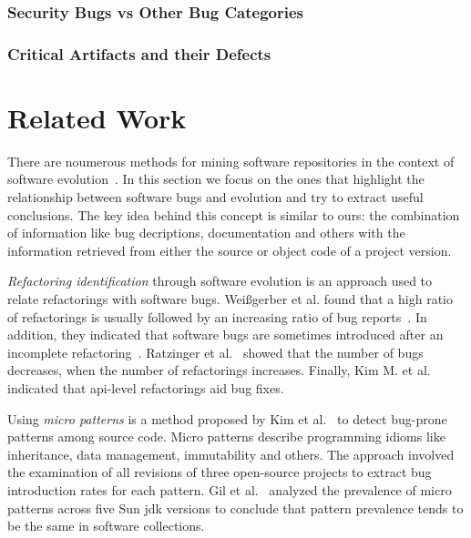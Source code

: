 \documentclass[conference]{IEEEtran}
\begin{document}
\subsubsection{Security Bugs {\sc vs} Other Bug Categories}

\subsubsection{Critical Artifacts and their Defects}

\section{Related Work}
\label{sec:rel}

There are noumerous methods for mining software repositories in the context
of software evolution~\cite{KCM07}. In this section we focus on the ones
that highlight the relationship between software bugs and evolution and try to
extract useful conclusions. The key idea behind this concept is
similar to ours: the combination of information like bug decriptions,
documentation and others with the information retrieved from either the source
or object code of a project version.

{\it Refactoring identification} through software evolution is an approach used to
relate refactorings with software bugs. Wei{\ss}gerber et al. found that a high
ratio of refactorings is usually followed by an increasing ratio of bug
reports~\cite{WD06}. In addition, they indicated that software bugs are sometimes introduced
after an incomplete refactoring~\cite{GW05}.
Ratzinger et al.~\cite{RSG08} showed that the number of bugs decreases, when the number of
refactorings increases. Finally, Kim M. et al.~\cite{KCK11} indicated that {\sc api}-level
refactorings aid bug fixes.

Using {\it micro patterns} is a method proposed by Kim et al.~\cite{KPW06}
to detect bug-prone patterns among source code. Micro patterns describe programming
idioms like inheritance, data management, immutability and others. The approach involved
the examination of all revisions of three open-source projects to extract bug
introduction rates for each pattern. Gil et al.~\cite{GM05} analyzed the
prevalence of micro patterns across five Sun {\sc jdk} versions to conclude that
pattern prevalence tends to be the same in software collections.
\end{document}
